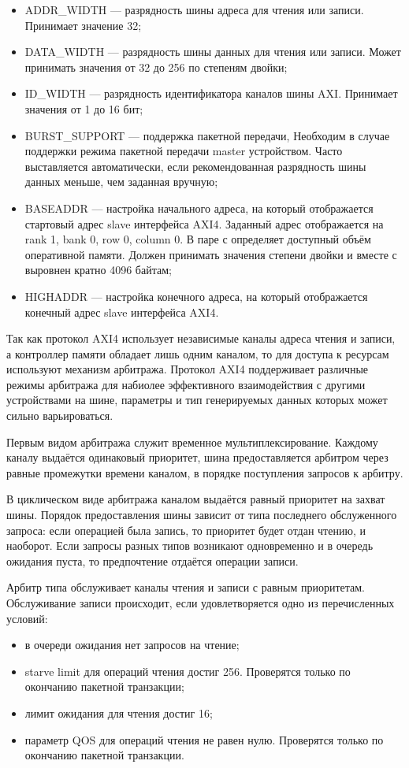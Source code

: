 \begin{itemize}
  \item ADDR\_WIDTH --- разрядность шины адреса для чтения или записи. Принимает значение 32;
  \item DATA\_WIDTH --- разрядность шины данных для чтения или записи. Может принимать значения
    от 32 до 256 по степеням двойки;
  \item ID\_WIDTH --- разрядность идентификатора каналов шины AXI. Принимает значения от 1 до 16 бит;
  \item BURST\_SUPPORT --- поддержка пакетной передачи, Необходим в случае поддержки режима пакетной передачи
    master устройством. Часто выставляется автоматически, если рекомендованная разрядность шины данных
    меньше, чем заданная вручную;
  \item BASEADDR --- настройка начального адреса, на который отображается стартовый адрес slave интерфейса
    AXI4. Заданный адрес отображается на rank 1, bank 0, row 0, column 0. В паре с  определяет
    доступный объём оперативной памяти. Должен принимать значения степени двойки и вместе с  выровнен
    кратно 4096 байтам;
  \item HIGHADDR --- настройка конечного адреса, на который отображается конечный адрес slave интерфейса
    AXI4.
\end{itemize}

Так как протокол AXI4 использует независимые каналы адреса чтения и записи, а контроллер памяти
обладает лишь одним каналом, то для доступа к ресурсам используют механизм арбитража.
Протокол AXI4 поддерживает различные режимы арбитража для набиолее эффективного взаимодействия с
другими устройствами на шине, параметры и тип генерируемых данных которых может сильно варьироваться.

Первым видом арбитража служит временное мультиплексирование. Каждому каналу выдаётся одинаковый приоритет,
шина предоставляется арбитром через равные промежутки времени каналом, в порядке поступления запросов к арбитру.

В циклическом виде арбитража каналом выдаётся равный приоритет на захват шины. Порядок предоставления шины
зависит от типа последнего обслуженного запроса: если операцией была запись, то приоритет будет отдан чтению,
и наоборот. Если запросы разных типов возникают одновременно и в очередь ожидания пуста, то предпочтение
отдаётся операции записи.

Арбитр типа  обслуживает каналы чтения и записи с равным приоритетам.
Обслуживание записи происходит, если удовлетворяется одно из перечисленных условий:
\begin{itemize}
  \item в очереди ожидания нет запросов на чтение;
  \item starve limit для операций чтения достиг 256. Проверятся только по окончанию пакетной транзакции;
  \item лимит ожидания для чтения достиг 16;
  \item параметр QOS для операций чтения не равен нулю. Проверятся только по окончанию пакетной транзакции.
\end{itemize}

